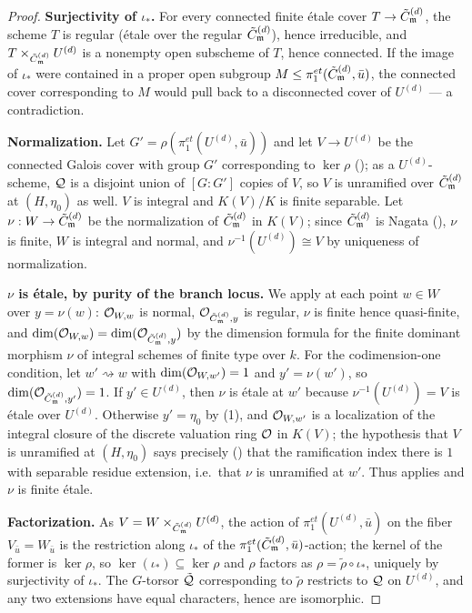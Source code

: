 \begin{proof}
    \textbf{Surjectivity of $\iota_*$.} For every connected finite étale cover
    $T \to \tilde{C}_{\mathfrak{m}}^{(d)}$, the scheme $T$ is regular (étale over the regular $\tilde{C}_{\mathfrak{m}}^{(d)}$), hence
    irreducible, and $T \times_{\tilde{C}_{\mathfrak{m}}^{(d)}} U^{(d)}$ is a nonempty open subscheme of $T$,
    hence connected. If the image of $\iota_*$ were contained in a proper open subgroup
    $M \leq \pi_1^{et}(\tilde{C}_{\mathfrak{m}}^{(d)}, \bar{u})$, the connected cover corresponding to $M$ would
    pull back to a disconnected cover of $U^{(d)}$ --- a contradiction.

    \textbf{Normalization.} Let $G' = \rho(\pi_1^{et}(U^{(d)}, \bar{u}))$ and let
    $V \to U^{(d)}$ be the connected Galois cover with group $G'$ corresponding to
    $\ker \rho$ (); as a $U^{(d)}$-scheme,
    $\mathcal{Q}$ is a disjoint union of $[G:G']$ copies of $V$, so $V$ is unramified over
    $\tilde{C}_{\mathfrak{m}}^{(d)}$ at $(H, \eta_0)$ as well. $V$ is integral and $K(V)/K$ is finite separable.
    Let $\nu : W \to \tilde{C}_{\mathfrak{m}}^{(d)}$ be the normalization of $\tilde{C}_{\mathfrak{m}}^{(d)}$ in $K(V)$; since
    $\tilde{C}_{\mathfrak{m}}^{(d)}$ is Nagata (), $\nu$ is finite, $W$ is integral and normal,
    and $\nu^{-1}(U^{(d)}) \cong V$ by uniqueness of normalization.

    \textbf{$\nu$ is étale, by purity of the branch locus.} We apply  at
    each point $w \in W$ over $y = \nu(w)$: $\mathcal{O}_{W,w}$ is normal, $\mathcal{O}_{\tilde{C}_{\mathfrak{m}}^{(d)},y}$ is
    regular, $\nu$ is finite hence quasi-finite, and
    $\dim(\mathcal{O}_{W,w}) = \dim(\mathcal{O}_{\tilde{C}_{\mathfrak{m}}^{(d)},y})$ by the dimension formula for the finite
    dominant morphism $\nu$ of integral schemes of finite type over $k$. For the
    codimension-one condition, let $w' \rightsquigarrow w$ with
    $\dim(\mathcal{O}_{W,w'}) = 1$ and $y' = \nu(w')$, so $\dim(\mathcal{O}_{\tilde{C}_{\mathfrak{m}}^{(d)},y'}) = 1$. If
    $y' \in U^{(d)}$, then $\nu$ is étale at $w'$ because $\nu^{-1}(U^{(d)}) = V$ is étale
    over $U^{(d)}$. Otherwise $y' = \eta_0$ by
    (1), and $\mathcal{O}_{W,w'}$ is a localization of
    the integral closure of the discrete valuation ring $\mathcal{O}$ in $K(V)$; the hypothesis
    that $V$ is unramified at $(H, \eta_0)$ says precisely
    () that the ramification index there is $1$ with
    separable residue extension, i.e.\ that $\nu$ is unramified at $w'$. Thus 
    applies and $\nu$ is finite étale.

    \textbf{Factorization.} As $V = W \times_{\tilde{C}_{\mathfrak{m}}^{(d)}} U^{(d)}$, the action of
    $\pi_1^{et}(U^{(d)}, \bar{u})$ on the fiber $V_{\bar{u}} = W_{\bar{u}}$ is the
    restriction along $\iota_*$ of the $\pi_1^{et}(\tilde{C}_{\mathfrak{m}}^{(d)}, \bar{u})$-action; the kernel
    of the former is $\ker \rho$, so $\ker(\iota_*) \subseteq \ker \rho$ and $\rho$ factors
    as $\rho = \tilde{\rho} \circ \iota_*$, uniquely by surjectivity of $\iota_*$. The
    $G$-torsor $\tilde{\mathcal{Q}}$ corresponding to $\tilde{\rho}$ restricts to $\mathcal{Q}$ on
    $U^{(d)}$, and any two extensions have equal characters, hence are isomorphic.
\end{proof}

